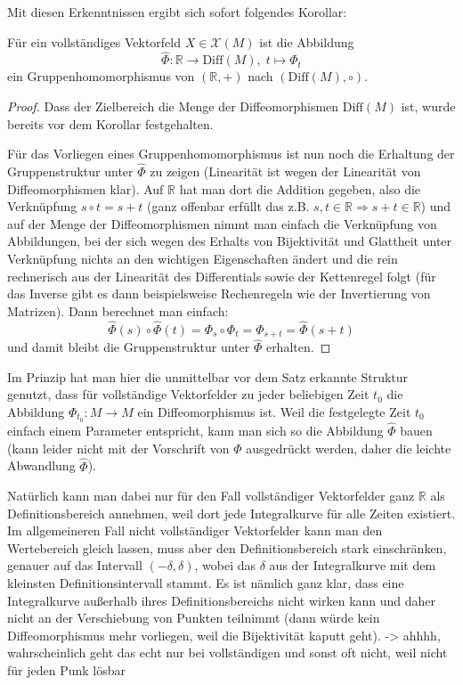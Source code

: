\documentclass[../H_Analysis_main.tex]{subfiles}
\begin{document}
Mit diesen Erkenntnissen ergibt sich sofort folgendes Korollar:
\begin{cor}[Flussabbildung]\label{cor:flussdiffeo}
Für ein vollständiges Vektorfeld $X \in \mathcal{X}(M)$ ist die Abbildung
\begin{equation}
\hat{\Phi}: \mathbb{R} \rightarrow \text{Diff}(M), \; t \mapsto \Phi_t
\end{equation}
ein Gruppenhomomorphismus von $(\mathbb{R}, +)$ nach $(\text{Diff}(M), \circ)$.
\end{cor}
\begin{proof}
Dass der Zielbereich die Menge der Diffeomorphismen $\text{Diff}(M)$ ist, wurde bereits vor dem Korollar festgehalten.

Für das Vorliegen eines Gruppenhomomorphismus ist nun noch die Erhaltung der Gruppenstruktur unter $\hat{\Phi}$ zu zeigen (Linearität ist wegen der Linearität von Diffeomorphismen klar). Auf $\mathbb{R}$ hat man dort die Addition gegeben, also die Verknüpfung $s \circ t = s + t$ (ganz offenbar erfüllt das z.B. $s, t \in \mathbb{R} \Rightarrow s + t \in \mathbb{R}$) und auf der Menge der Diffeomorphismen nimmt man einfach die Verknüpfung von Abbildungen, bei der sich wegen des Erhalts von Bijektivität und Glattheit unter Verknüpfung nichts an den wichtigen Eigenschaften ändert und die rein rechnerisch aus der Linearität des Differentials sowie der Kettenregel folgt (für das Inverse gibt es dann beispielsweise Rechenregeln wie der Invertierung von Matrizen). Dann berechnet man einfach:
\begin{equation*}
\hat{\Phi}(s) \circ \hat{\Phi}(t) = \Phi_s \circ \Phi_t = \Phi_{s + t} = \hat{\Phi}(s + t)
\end{equation*}
und damit bleibt die Gruppenstruktur unter $\hat{\Phi}$ erhalten.
\end{proof}

Im Prinzip hat man hier die unmittelbar vor dem Satz erkannte Struktur genutzt, dass für vollständige Vektorfelder zu jeder beliebigen Zeit $t_0$ die Abbildung $\Phi_{t_0}: M \rightarrow M$ ein Diffeomorphismus ist. Weil die festgelegte Zeit $t_0$ einfach einem Parameter entspricht, kann man sich so die Abbildung $\hat{\Phi}$ bauen (kann leider nicht mit der Vorschrift von $\Phi$ ausgedrückt werden, daher die leichte Abwandlung $\hat{\Phi}$).


Natürlich kann man dabei nur für den Fall vollständiger Vektorfelder ganz $\mathbb{R}$ als Definitionsbereich annehmen, weil dort jede Integralkurve für alle Zeiten existiert. Im allgemeineren Fall nicht vollständiger Vektorfelder kann man den Wertebereich gleich lassen, muss aber den Definitionsbereich stark einschränken, genauer auf das Intervall $(-\delta, \delta)$, wobei das $\delta$ aus der Integralkurve mit dem kleinsten Definitionsintervall stammt. Es ist nämlich ganz klar, dass eine Integralkurve außerhalb ihres Definitionsbereichs nicht wirken kann und daher nicht an der Verschiebung von Punkten teilnimmt (dann würde kein Diffeomorphismus mehr vorliegen, weil die Bijektivität kaputt geht). -> ahhhh, wahrscheinlich geht das echt nur bei vollständigen und sonst oft nicht, weil nicht für jeden Punk lösbar
\end{document}
